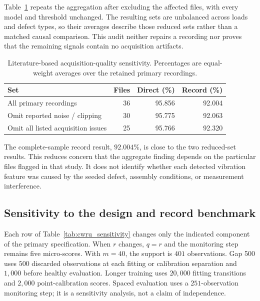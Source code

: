 \documentclass[11pt]{article}
\theoremstyle{definition}
\theoremstyle{remark}
\newcommand{\1}{\mathbf 1}
\begin{document}
Table~\ref{tab:cwru_quality} repeats the aggregation after excluding the affected files, with every model and threshold unchanged. The resulting sets are unbalanced across loads and defect types, so their averages describe those reduced sets rather than a matched causal comparison. This audit neither repairs a recording nor proves that the remaining signals contain no acquisition artifacts.

\begin{table}[H]
\centering\small
\begin{tabular}{lrrr}
\toprule
Set & Files & Direct (\%) & Record (\%) \\
\midrule
All primary recordings & 36 & 95.856 & 92.004 \\
Omit reported noise / clipping & 30 & 95.775 & 92.063 \\
Omit all listed acquisition issues & 25 & 95.766 & 92.320 \\
\bottomrule
\end{tabular}
\caption{Literature-based acquisition-quality sensitivity. Percentages are equal-weight averages over the retained primary recordings.}
\label{tab:cwru_quality}
\end{table}

The complete-sample record result, \(92.004\%\), is close to the two reduced-set results. This reduces concern that the aggregate finding depends on the particular files flagged in that study. It does not identify whether each detected vibration feature was caused by the seeded defect, assembly conditions, or measurement interference.

\clearpage
\subsection{Sensitivity to the design and record benchmark}\hypertarget{app:cwru:sensitivity}{}

Each row of Table~\ref{tab:cwru_sensitivity} changes only the indicated component of the primary specification. When \(r\) changes, \(q=r\) and the monitoring step remains five micro-scores. With \(m=40\), the support is \(401\) observations. Gap 500 uses \(500\) discarded observations at each fitting or calibration separation and \(1{,}000\) before healthy evaluation. Longer training uses \(20{,}000\) fitting transitions and \(2{,}000\) point-calibration scores. Spaced evaluation uses a \(251\)-observation monitoring step; it is a sensitivity analysis, not a claim of independence.
\end{document}
